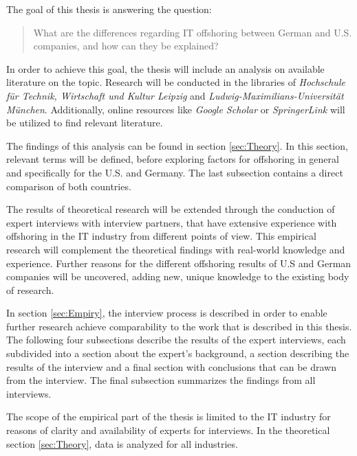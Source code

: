 The goal of this thesis is answering the question:

\begin{quote}
	\centering
	What are the differences regarding IT offshoring between German and U.S. companies, and how can they be explained?
\end{quote}

In order to achieve this goal, the thesis will include an analysis on available literature on the topic. Research will be conducted in the libraries of \textit{Hochschule für Technik, Wirtschaft und Kultur Leipzig} and \textit{Ludwig-Maximilians-Universität München}. Additionally, online resources like \textit{Google Scholar} or \textit{SpringerLink} will be utilized to find relevant literature. 

The findings of this analysis can be found in section \ref{sec:Theory}. In this section, relevant terms will be defined, before exploring factors for offshoring in general and specifically for the U.S. and Germany. The last subsection contains a direct comparison of both countries.

The results of theoretical research will be extended through the conduction of expert interviews with interview partners, that have extensive experience with offshoring in the IT industry from different points of view. This empirical research will complement the theoretical findings with real-world knowledge and experience. Further reasons for the different offshoring results of U.S and German companies will be uncovered, adding new, unique knowledge to the existing body of research.

In section \ref{sec:Empiry}, the interview process is described in order to enable further research achieve comparability to the work that is described in this thesis. The following four subsections describe the results of the expert interviews, each subdivided into a section about the expert's background, a section describing the results of the interview and a final section with conclusions that can be drawn from the interview. The final subsection summarizes the findings from all interviews.

The scope of the empirical part of the thesis is limited to the IT industry for reasons of clarity and availability of experts for interviews. In the theoretical section \ref{sec:Theory}, data is analyzed for all industries.